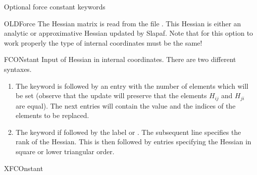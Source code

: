 Optional force constant keywords
\begin{keywordlist}
\item[OLDForce]
The Hessian matrix is read from the file .
This Hessian is either
an analytic or approximative Hessian updated by Slapaf.
Note that for this option to work properly the type of
internal coordinates must be the same!
\item[FCONstant]
Input of Hessian in internal coordinates.
There are two different syntaxes.
\begin{enumerate}
\item
The keyword is followed by an entry with
the number of elements which will be set (observe that the
update will preserve that the elements $H_{ij}$ and $H_{ji}$ are
equal). The next entries will contain the value and the indices of
the elements to be replaced.
\item
The keyword if followed by the label  or
. The subsequent line specifies the rank of the
Hessian. This is then followed by entries specifying the Hessian
in square or lower triangular order.
\end{enumerate}
\item[XFCOnstant]

\end{keywordlist}
